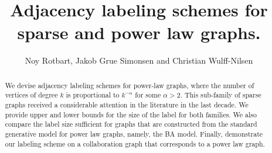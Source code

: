\documentclass{article}
\title{Adjacency labeling  schemes for sparse and power law graphs.}
\author{Noy Rotbart, Jakob Grue Simonsen and Christian Wulff-Nilsen}
\theoremstyle{remark}
\begin{document}
\maketitle
\begin{abstract}
We devise adjacency labeling schemes for power-law graphs, where the number of vertices of degree $k$ is proportional to $k^{-\alpha}$ for some $\alpha>2$.
 This  sub-family of sparse graphs received a considerable attention in the literature in the last decade.
 We provide upper and lower bounds for the size of the label for  both families.
 We also compare the label size sufficient for graphs that are constructed from the standard generative model for power law graphs, namely, the BA model.
Finally, demonstrate our labeling scheme on a collaboration graph that corresponds to a power law graph.

\end{abstract}
\newpage








\newpage
 

\end{document}

